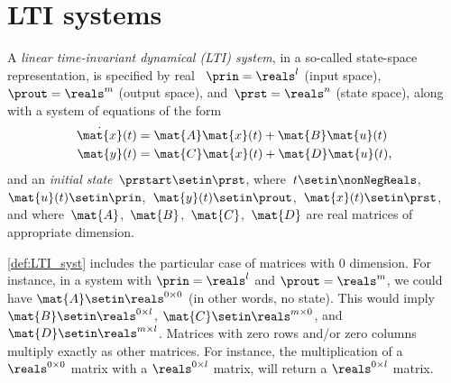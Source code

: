 
\section{LTI systems}
\label{sec:LTI-systems}



\begin{definition}
    \label{def:LTI_syst}
    A \emph{linear time-invariant dynamical (LTI) system}, in a so-called state-space representation, is specified by real ~$\prin=\reals^l$ (input space),~$\prout=\reals^m$ (output space), and~$\prst=\reals^n$ (state space), along with a system of equations of the form
    \begin{align}
        \dot{\mat{x}}(t) & = \mat{A}\mat{x}(t) + \mat{B}\mat{u}(t) \label{eq:LTI-system-dyn} \\
        \mat{y}(t)       & = \mat{C}\mat{x}(t) + \mat{D}\mat{u}(t) \label{eq:LTI-system-ro},
    \end{align}
    and an \emph{initial state}~$\prstart\setin \prst$, where~$t \setin \nonNegReals$,~$\mat{u}(t) \setin \prin$,~$\mat{y}(t) \setin \prout$,~$\mat{x}(t) \setin \prst$, and where~$\mat{A}$,~$\mat{B}$,~$\mat{C}$,~$\mat{D}$ are real matrices of appropriate dimension.
\end{definition}
\begin{remark}
    \cref{def:LTI_syst} includes the particular case of matrices with 0 dimension.
    For instance, in a system with $\prin=\reals^l$ and $\prout=\reals^m$, we could have $\mat{A}\setin \reals^{0\times 0}$ (in other words, no state).
    This would imply $\mat{B}\setin \reals^{0\times l}$, $\mat{C}\setin \reals^{m\times 0}$, and $\mat{D}\setin \reals^{m\times l}$.
    Matrices with zero rows and/or zero columns multiply exactly as other matrices.
    For instance, the multiplication of a $\reals^{0\times 0}$ matrix with a $\reals^{0\times l}$ matrix, will return a $\reals^{0\times l}$ matrix.
\end{remark}

